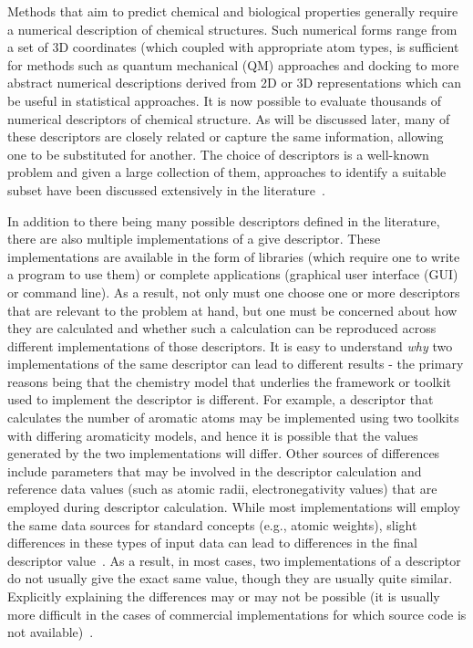 \documentclass[letterpaper, 12pt]{article}
\begin{document}
Methods that aim to predict chemical and biological properties
generally require a numerical description of chemical structures. Such
numerical forms range from a set of 3D coordinates (which coupled with
appropriate atom types, is sufficient for methods such as quantum
mechanical (QM) approaches and docking to more abstract numerical
descriptions derived from 2D or 3D representations which can be useful
in statistical approaches. It is now possible to evaluate thousands of
numerical descriptors of chemical structure. As will be discussed
later, many of these descriptors are closely related or capture the
same information, allowing one to be substituted for another. The
choice of descriptors is a well-known problem and given a large
collection of them, approaches to identify a suitable subset have been
discussed extensively in the
literature~\cite{Miller:2002aa,Kohavi:1997gf}.

In addition to there being many possible descriptors defined in the
literature, there are also multiple implementations of a give
descriptor. These implementations are available in the form of
libraries (which require one to write a program to use them) or
complete applications (graphical user interface (GUI) or command
line). As a result, not only must one choose one or more descriptors
that are relevant to the problem at hand, but one must be concerned
about how they are calculated and whether such a calculation can be
reproduced across different implementations of those descriptors. It
is easy to understand \emph{why} two implementations of the same
descriptor can lead to different results - the primary reasons being
that the chemistry model that underlies the framework or toolkit used
to implement the descriptor is different. For example, a descriptor
that calculates the number of aromatic atoms may be implemented using
two toolkits with differing aromaticity models, and hence it is
possible that the values generated by the two implementations will
differ. Other sources of differences include parameters that may be
involved in the descriptor calculation and reference data values (such
as atomic radii, electronegativity values) that are employed during
descriptor calculation. While most implementations will employ the
same data sources for standard concepts (e.g., atomic weights), slight
differences in these types of input data can lead to differences in
the final descriptor value~\cite{Guha:2006ac}. As a result, in most
cases, two implementations of a descriptor do not usually give the
exact same value, though they are usually quite similar. Explicitly
explaining the differences may or may not be possible (it is usually
more difficult in the cases of commercial implementations for which
source code is not available)~\cite{Spjuth2010}.
\end{document}
